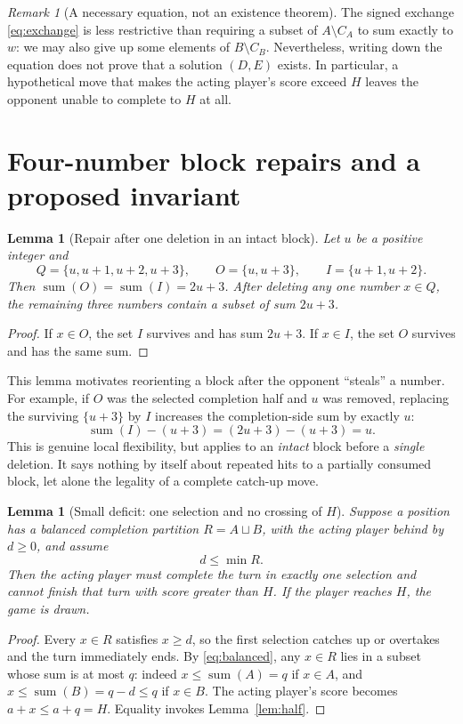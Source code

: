 \documentclass[11pt,a4paper]{article}
\newtheorem{lemma}[theorem]{Lemma}
\theoremstyle{definition}
\theoremstyle{remark}
\newtheorem{remark}[theorem]{Remark}
\newcommand{\sm}{\operatorname{sum}}
\begin{document}
\begin{remark}[A necessary equation, not an existence theorem]
The signed exchange \eqref{eq:exchange} is less restrictive than
requiring a subset of $A\setminus C_A$ to sum exactly to $w$:
we may also give up some elements of $B\setminus C_B$.
Nevertheless, writing down the equation does not prove that a
solution $(D,E)$ exists.  In particular, a hypothetical move that
makes the acting player's score exceed $H$ leaves the opponent
unable to complete to $H$ at all.
\end{remark}

\section{Four-number block repairs and a proposed invariant}

\begin{lemma}[Repair after one deletion in an intact block]
\label{lem:block}
Let $u$ be a positive integer and
\[
Q=\{u,u+1,u+2,u+3\},\qquad
O=\{u,u+3\},\qquad I=\{u+1,u+2\}.
\]
Then $\sm(O)=\sm(I)=2u+3$.  After deleting \emph{any one}
number $x\in Q$, the remaining three numbers contain a subset of
sum $2u+3$.
\end{lemma}
\begin{proof}
If $x\in O$, the set $I$ survives and has sum $2u+3$.
If $x\in I$, the set $O$ survives and has the same sum.
\end{proof}

This lemma motivates reorienting a block after the opponent
``steals'' a number.  For example, if $O$ was the selected completion
half and $u$ was removed, replacing the surviving $\{u+3\}$ by
$I$ increases the completion-side sum by exactly $u$:
\[
\sm(I)-(u+3)=(2u+3)-(u+3)=u.
\]
This is genuine local flexibility, but applies to an \emph{intact}
block before a \emph{single} deletion.  It says nothing by itself
about repeated hits to a partially consumed block, let alone the
legality of a complete catch-up move.

\begin{lemma}[Small deficit: one selection and no crossing of $H$]
\label{lem:small}
Suppose a position has a balanced completion partition
$R=A\sqcup B$, with the acting player behind by $d\ge0$, and assume
\begin{equation}\label{eq:small}
\boxed{d\le\min R.}
\end{equation}
Then the acting player must complete the turn in \emph{exactly one}
selection and cannot finish that turn with score greater than $H$.
If the player reaches $H$, the game is drawn.
\end{lemma}
\begin{proof}
Every $x\in R$ satisfies $x\ge d$, so the first selection catches
up or overtakes and the turn immediately ends.  By
\eqref{eq:balanced}, any $x\in R$ lies in a subset whose sum is at
most $q$: indeed $x\le\sm(A)=q$ if $x\in A$, and
$x\le\sm(B)=q-d\le q$ if $x\in B$.  The acting player's score
becomes $a+x\le a+q=H$.  Equality invokes Lemma~\ref{lem:half}.
\end{proof}
\end{document}
